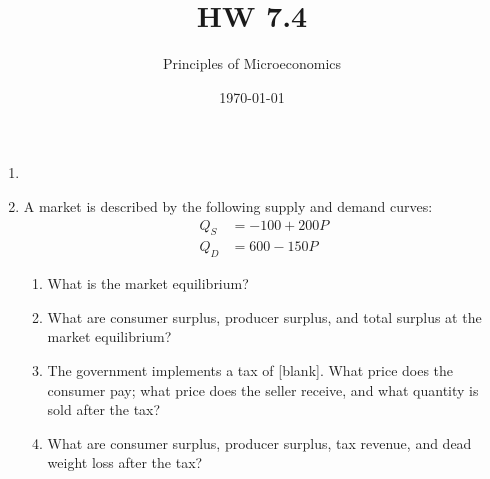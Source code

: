 \documentclass{article}
\title{HW 7.4}
\author{Principles of Microeconomics}
\date{\today}
\begin{document}
\maketitle

\begin{enumerate}

\item

\item A market is described by the following supply and demand curves:
	\begin{align*}
	Q_S &= -100 + 200P \\
	Q_D &= 600 - 150P
	\end{align*}

	\begin{enumerate}
	
	\item What is the market equilibrium?
	
	\item What are consumer surplus, producer surplus, and total surplus at the market equilibrium?
	
	\item The government implements a tax of [blank]. What price does the consumer pay; what price does the seller receive, and what quantity is sold after the tax?
	
	\item What are consumer surplus, producer surplus, tax revenue, and dead weight loss after the tax?
	
	\end{enumerate}

\end{enumerate}
\end{document}
